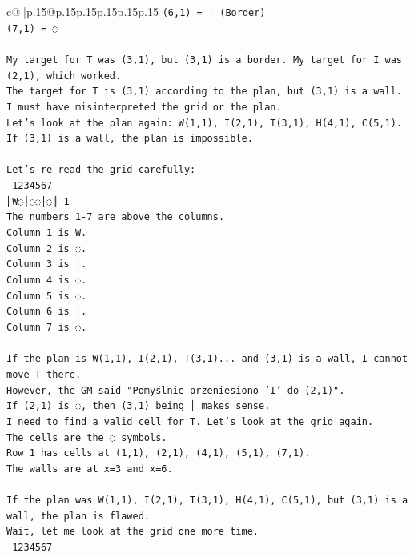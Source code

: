 \documentclass{article}
\begin{document}
{\begin{supertabular}{c@{$\;$}|p{.15\linewidth}@{}p{.15\linewidth}p{.15\linewidth}p{.15\linewidth}p{.15\linewidth}p{.15\linewidth}}
{{{\texttt{(6,1) = │ (Border)} \\
\texttt{(7,1) = ◌} \\
\\ 
\texttt{My target for T was (3,1), but (3,1) is a border. My target for I was (2,1), which worked.} \\
\texttt{The target for T is (3,1) according to the plan, but (3,1) is a wall. I must have misinterpreted the grid or the plan.} \\
\texttt{Let's look at the plan again: W(1,1), I(2,1), T(3,1), H(4,1), C(5,1).} \\
\texttt{If (3,1) is a wall, the plan is impossible.} \\
\\ 
\texttt{Let's re{-}read the grid carefully:} \\
\texttt{ 1234567} \\
\texttt{║W◌│◌◌│◌║ 1} \\
\texttt{The numbers 1{-}7 are above the columns.} \\
\texttt{Column 1 is W.} \\
\texttt{Column 2 is ◌.} \\
\texttt{Column 3 is │.} \\
\texttt{Column 4 is ◌.} \\
\texttt{Column 5 is ◌.} \\
\texttt{Column 6 is │.} \\
\texttt{Column 7 is ◌.} \\
\\ 
\texttt{If the plan is W(1,1), I(2,1), T(3,1)... and (3,1) is a wall, I cannot move T there.} \\
\texttt{However, the GM said "Pomyślnie przeniesiono 'I' do (2,1)".} \\
\texttt{If (2,1) is ◌, then (3,1) being │ makes sense.} \\
\texttt{I need to find a valid cell for T. Let's look at the grid again.} \\
\texttt{The cells are the ◌ symbols.} \\
\texttt{Row 1 has cells at (1,1), (2,1), (4,1), (5,1), (7,1).} \\
\texttt{The walls are at x=3 and x=6.} \\
\\ 
\texttt{If the plan was W(1,1), I(2,1), T(3,1), H(4,1), C(5,1), but (3,1) is a wall, the plan is flawed.} \\
\texttt{Wait, let me look at the grid one more time.} \\
\texttt{ 1234567} \\
}}}
\end{supertabular}}
\end{document}
